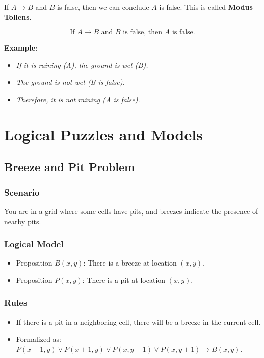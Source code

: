 \documentclass{article}
\begin{document}
If $A \rightarrow B$ and $B$ is false, then we can conclude $A$ is false. This is called \textbf{Modus Tollens}.

\[
\text{If } A \rightarrow B \text{ and } B \text{ is false, then } A \text{ is false.}
\]

\textbf{Example}:
\begin{itemize}
    \item \textit{If it is raining (A), the ground is wet (B).}
    \item \textit{The ground is not wet (B is false).}
    \item \textit{Therefore, it is not raining (A is false).}
\end{itemize}

\section{Logical Puzzles and Models}

\subsection{Breeze and Pit Problem}

\subsubsection{Scenario}
You are in a grid where some cells have pits, and breezes indicate the presence of nearby pits.

\subsubsection{Logical Model}
\begin{itemize}
    \item Proposition $B(x, y)$: There is a breeze at location $(x, y)$.
    \item Proposition $P(x, y)$: There is a pit at location $(x, y)$.
\end{itemize}

\subsubsection{Rules}
\begin{itemize}
    \item If there is a pit in a neighboring cell, there will be a breeze in the current cell.
    \item Formalized as: $P(x-1, y) \lor P(x+1, y) \lor P(x, y-1) \lor P(x, y+1) \rightarrow B(x, y)$.
\end{itemize}
\end{document}
